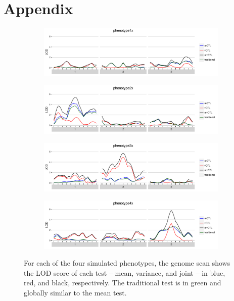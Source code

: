 \documentclass{article}
\begin{document}
\clearpage
\newpage
\section*{Appendix}

\begin{figure}[ht!]
    \begin{subfigure}[b]{0.9\textwidth}
        \includegraphics[width=\textwidth]{images/LOD_scan_phenotype1x.pdf}
    \end{subfigure}

    \begin{subfigure}[b]{0.9\textwidth}
        \includegraphics[width=\textwidth]{images/LOD_scan_phenotype2x.pdf}
    \end{subfigure}

    \begin{subfigure}[b]{0.9\textwidth}
        \includegraphics[width=\textwidth]{images/LOD_scan_phenotype3x.pdf}
    \end{subfigure}

    \begin{subfigure}[b]{0.9\textwidth}
        \includegraphics[width=\textwidth]{images/LOD_scan_phenotype4x.pdf}
    \end{subfigure}

    \caption{For each of the four simulated phenotypes, the genome scan shows the LOD score of each test -- mean, variance, and joint -- in blue, red, and black, respectively.  The traditional test is in green and globally similar to the mean test. \label{fig:apdx_lod_score_scans}}
\end{figure}
\end{document}
